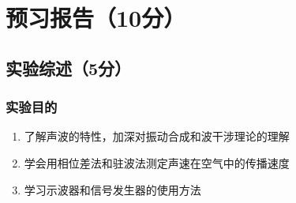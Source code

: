 \documentclass{Preport}
\begin{document}
\makeatletter
\renewcommand{\figurename}{图}
\renewcommand{\tablename}{表}
\setcounter{page}{0}
\makecover

\section{预习报告（10分）}
\subsection{实验综述（5分）}
\subsubsection{实验目的}
\begin{enumerate}
	\item 了解声波的特性，加深对振动合成和波干涉理论的理解
	\item 学会用相位差法和驻波法测定声速在空气中的传播速度
	\item 学习示波器和信号发生器的使用方法
\end{enumerate}
\end{document}
